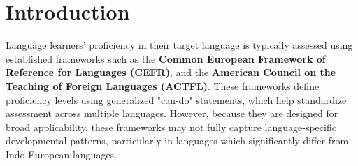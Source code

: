 \chapter{Introduction}










Language learners' proficiency in their target language is typically assessed using established frameworks such as the \textbf{Common European Framework of Reference for Languages (CEFR)}, and the \textbf{American Council on the Teaching of Foreign Languages (ACTFL)}. These frameworks define proficiency levels using generalized "can-do" statements, which help standardize assessment across multiple languages.  However, because they are designed for broad applicability, these frameworks may not fully capture language-specific developmental patterns, particularly in languages which significantly differ from Indo-European languages.

